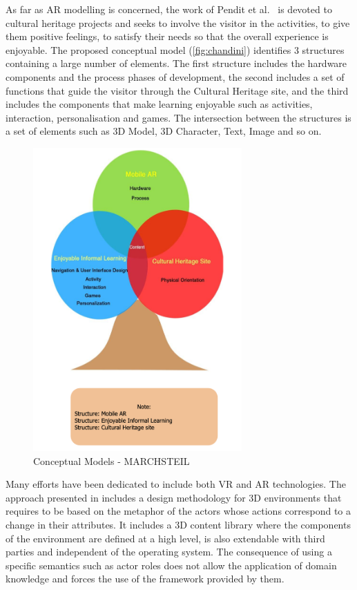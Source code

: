 As far as AR modelling is concerned, the work of Pendit et al.~\cite{chandini_pendit_conceptual_2015} is devoted to cultural heritage projects and seeks to involve the visitor in the activities, to give them positive feelings, to satisfy their needs so that the overall experience is enjoyable. The proposed conceptual model (\autoref{fig:chandini}) identifies 3 structures containing a large number of elements. The first structure includes the hardware components and the process phases of development, the second includes a set of functions that guide the visitor through the Cultural Heritage site, and the third includes the components that make learning enjoyable such as activities, interaction, personalisation and games. The intersection between the structures is a set of elements such as 3D Model, 3D Character, Text, Image and so on.

\begin{figure}[htbp]
    \centering
    \includegraphics[width=8cm]{Figures/Background/models/ChandiniP.png}
    \caption{Conceptual Models - MARCHSTEIL}
    \label{fig:chandini}
\end{figure}

Many efforts have been dedicated to include both VR and AR technologies. The approach presented in \cite{geiger_structured_2001} includes a design methodology for 3D environments that requires to be based on the metaphor of the actors whose actions correspond to a change in their attributes. It includes a 3D content library where the components of the environment are defined at a high level, is also extendable with third parties and independent of the operating system. The consequence of using a specific semantics such as actor roles does not allow the application of domain knowledge and forces the use of the framework provided by them.

